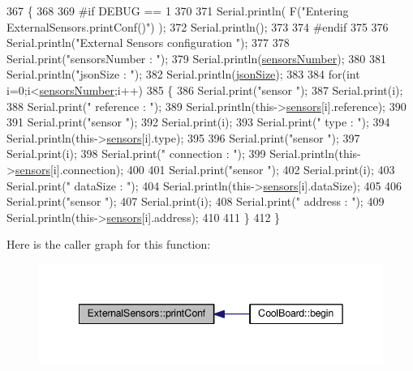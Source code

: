 \begin{DoxyCode}
367 \{
368 
369 \textcolor{preprocessor}{#if DEBUG == 1}
370 
371     Serial.println( F(\textcolor{stringliteral}{"Entering ExternalSensors.printConf()"}) );
372     Serial.println();
373 
374 \textcolor{preprocessor}{#endif }
375 
376     Serial.println(\textcolor{stringliteral}{"External Sensors configuration "});
377 
378     Serial.print(\textcolor{stringliteral}{"sensorsNumber : "});
379     Serial.println(\hyperlink{classExternalSensors_a58e4fbf9adeae787d92be5fa33043b5d}{sensorsNumber});
380 
381     Serial.println(\textcolor{stringliteral}{"jsonSize : "});
382     Serial.println(\hyperlink{classExternalSensors_acacea86d74d967b57fcff282d26cff57}{jsonSize});
383 
384     \textcolor{keywordflow}{for}(\textcolor{keywordtype}{int} i=0;i<\hyperlink{classExternalSensors_a58e4fbf9adeae787d92be5fa33043b5d}{sensorsNumber};i++)
385     \{
386         Serial.print(\textcolor{stringliteral}{"sensor "});
387         Serial.print(i);
388         Serial.print(\textcolor{stringliteral}{" reference : "});
389         Serial.println(this->\hyperlink{classExternalSensors_a284233f884fcf00154a44740cf1d9e1e}{sensors}[i].reference);
390 
391         Serial.print(\textcolor{stringliteral}{"sensor "});
392         Serial.print(i);
393         Serial.print(\textcolor{stringliteral}{" type : "});
394         Serial.println(this->\hyperlink{classExternalSensors_a284233f884fcf00154a44740cf1d9e1e}{sensors}[i].type);
395 
396         Serial.print(\textcolor{stringliteral}{"sensor "});
397         Serial.print(i);
398         Serial.print(\textcolor{stringliteral}{" connection : "});
399         Serial.println(this->\hyperlink{classExternalSensors_a284233f884fcf00154a44740cf1d9e1e}{sensors}[i].connection);
400         
401         Serial.print(\textcolor{stringliteral}{"sensor "});
402         Serial.print(i);
403         Serial.print(\textcolor{stringliteral}{" dataSize : "});
404         Serial.println(this->\hyperlink{classExternalSensors_a284233f884fcf00154a44740cf1d9e1e}{sensors}[i].dataSize);
405         
406         Serial.print(\textcolor{stringliteral}{"sensor "});
407         Serial.print(i);
408         Serial.print(\textcolor{stringliteral}{" address : "});
409         Serial.println(this->\hyperlink{classExternalSensors_a284233f884fcf00154a44740cf1d9e1e}{sensors}[i].address);
410     
411     \}
412 \}
\end{DoxyCode}
Here is the caller graph for this function\+:
\nopagebreak
\begin{figure}[H]
\begin{center}
\leavevmode
\includegraphics[width=342pt]{classExternalSensors_a78c2bf55084435dd51d3c559b2d3c6f3_icgraph}
\end{center}
\end{figure}

